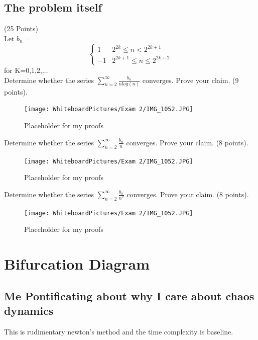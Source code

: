 \subsection{The problem itself}
(25 Points) \\ 
Let $b_n=$ \[ \begin{cases} 
      1 & 2^{2k}\leq n <2^{2k+1} \\
      -1 & 2^{2k+1} \leq n\leq 2^{2k+2} 
   \end{cases}
\] 
for K=0,1,2,... \\ 
Determine whether the series $\sum_{n=2}^\infty \frac{b_n}{n log(n)}$ converges. Prove your claim. (9 points). \\ 
\begin{figure}[h]\begin{center}\texttt{[image: WhiteboardPictures/Exam 2/IMG\_1052.JPG]}
\caption{Placeholder for my proofs} \label{fig:Euler_pic}\end{center}\end{figure} 

\newpage
Determine whether the series $\sum_{n=2}^\infty \frac{b_n}{n}$ converges. Prove your claim. (8 points). \\ 
\begin{figure}[h]\begin{center}\texttt{[image: WhiteboardPictures/Exam 2/IMG\_1052.JPG]}
\caption{Placeholder for my proofs} \label{fig:Euler_pic}\end{center}\end{figure} 

\newpage 
Determine whether the series $\sum_{n=2}^\infty \frac{b_n}{n^2}$ converges. Prove your claim. (8 points). \\ 

\begin{figure}[h]\begin{center}\texttt{[image: WhiteboardPictures/Exam 2/IMG\_1052.JPG]}
\caption{Placeholder for my proofs} \label{fig:Euler_pic}\end{center}\end{figure} 

\newpage


\section{Bifurcation Diagram}


\subsection{Me Pontificating about why I care about chaos dynamics}
This is rudimentary newton's method and the time complexity is baseline. 


